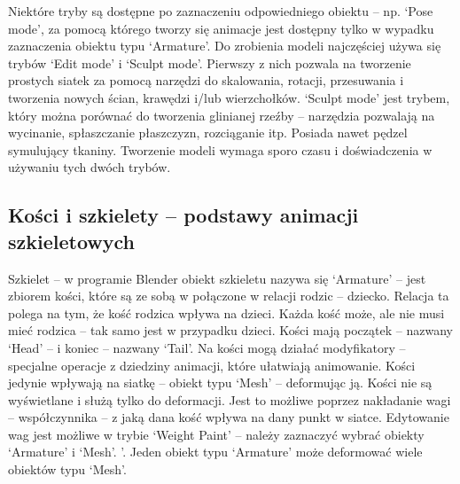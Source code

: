 \documentclass[12pt,twoside]{article}
\begin{document}
Niektóre tryby są dostępne po zaznaczeniu odpowiedniego obiektu -- np.
`Pose mode', za pomocą którego tworzy się animacje jest dostępny tylko w wypadku
zaznaczenia obiektu typu `Armature'. Do zrobienia modeli najczęściej używa się
trybów `Edit mode' i `Sculpt mode'. Pierwszy z nich pozwala na tworzenie
prostych siatek za pomocą narzędzi do skalowania, rotacji, przesuwania i
tworzenia nowych ścian, krawędzi i/lub wierzchołków. `Sculpt mode' jest trybem,
który można porównać do tworzenia glinianej rzeźby -- narzędzia pozwalają na
wycinanie, spłaszczanie płaszczyzn, rozciąganie itp. Posiada nawet pędzel
symulujący tkaniny. Tworzenie modeli wymaga sporo czasu i doświadczenia w
używaniu tych dwóch trybów.

\subsection{Kości i szkielety -- podstawy animacji szkieletowych}
Szkielet -- w programie Blender obiekt szkieletu nazywa się `Armature' -- jest
zbiorem kości, które są ze sobą w połączone w relacji rodzic -- dziecko. Relacja
ta polega na tym, że kość rodzica wpływa na dzieci. Każda kość może, ale nie musi
mieć rodzica -- tak samo jest w przypadku dzieci. Kości mają początek -- nazwany
`Head' -- i koniec -- nazwany `Tail'. Na kości mogą działać modyfikatory –
specjalne operacje z dziedziny animacji, które ułatwiają animowanie. Kości
jedynie wpływają na siatkę -- obiekt typu `Mesh' -- deformując ją. Kości nie są
wyświetlane i służą tylko do deformacji. Jest to możliwe poprzez nakładanie wagi
– współczynnika -- z jaką dana kość wpływa na dany punkt w siatce. Edytowanie wag
jest możliwe  w trybie `Weight Paint' -- należy zaznaczyć wybrać obiekty
`Armature' i `Mesh'. '. Jeden obiekt typu `Armature' może deformować wiele
obiektów typu `Mesh'.
\end{document}

